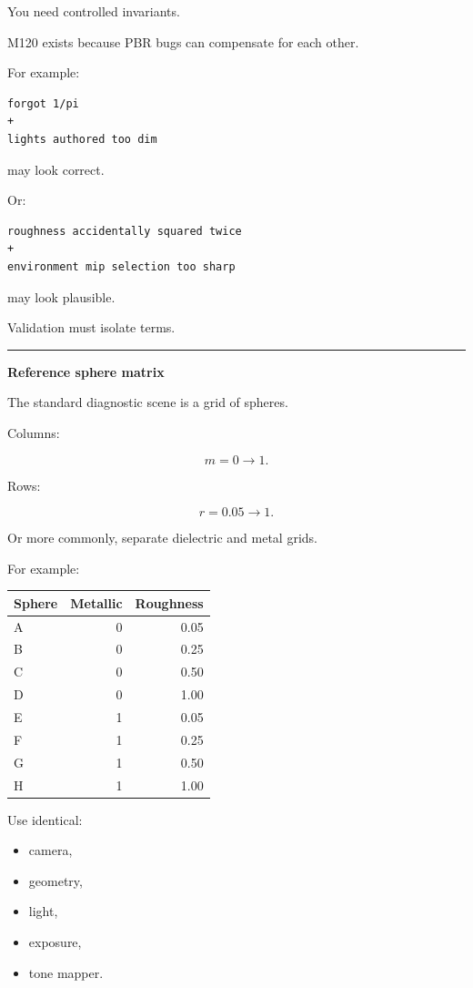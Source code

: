You need controlled invariants.

M120 exists because PBR bugs can compensate for each other.

For example:

\begin{verbatim}
forgot 1/pi
+
lights authored too dim
\end{verbatim}

may look correct.

Or:

\begin{verbatim}
roughness accidentally squared twice
+
environment mip selection too sharp
\end{verbatim}

may look plausible.

Validation must isolate terms.

\begin{center}\rule{0.5\linewidth}{0.5pt}\end{center}

\textbf{Reference sphere matrix}

The standard diagnostic scene is a grid of spheres.

Columns:

\[
m=0\rightarrow1.
\]

Rows:

\[
r=0.05\rightarrow1.
\]

Or more commonly, separate dielectric and metal grids.

For example:

{\def\LTcaptype{none} %
\begin{longtable}[]{@{}lrr@{}}
\toprule\noalign{}
Sphere & Metallic & Roughness \\
\midrule\noalign{}
\endhead
\bottomrule\noalign{}
\endlastfoot
A & 0 & 0.05 \\
B & 0 & 0.25 \\
C & 0 & 0.50 \\
D & 0 & 1.00 \\
E & 1 & 0.05 \\
F & 1 & 0.25 \\
G & 1 & 0.50 \\
H & 1 & 1.00 \\
\end{longtable}
}

Use identical:

\begin{itemize}
\tightlist
\item
  camera,
\item
  geometry,
\item
  light,
\item
  exposure,
\item
  tone mapper.
\end{itemize}

